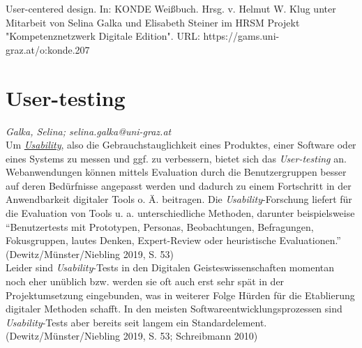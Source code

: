 \documentclass{article}
\begin{document}
User-centered design. In: KONDE Weißbuch. Hrsg. v. Helmut W. Klug unter Mitarbeit von Selina Galka und Elisabeth Steiner im HRSM Projekt "Kompetenznetzwerk Digitale Edition". URL: https://gams.uni-graz.at/o:konde.207\newpage\section*{User-testing} \emph{Galka, Selina; selina.galka@uni-graz.at}\\
        
    Um \emph{\href{http://gams.uni-graz.at/o:konde.205}{Usability}}, also die Gebrauchstauglichkeit eines Produktes, einer Software oder eines
                  Systems zu messen und ggf. zu verbessern, bietet sich das \emph{User-testing} an. Webanwendungen können mittels Evaluation durch die
                  Benutzergruppen besser auf deren Bedürfnisse angepasst werden und dadurch zu einem
                  Fortschritt in der Anwendbarkeit digitaler Tools o. Ä. beitragen. Die \emph{Usability}-Forschung liefert für die Evaluation von Tools u.
                  a. unterschiedliche Methoden, darunter beispielsweise “Benutzertests mit
                  Prototypen, Personas, Beobachtungen, Befragungen, Fokusgruppen, lautes Denken,
                  Expert-Review oder heuristische Evaluationen.” (Dewitz/Münster/Niebling
                     2019, S. 53)\\
            
        Leider sind \emph{Usability}-Tests in den Digitalen
                  Geisteswissenschaften momentan noch eher unüblich bzw. werden sie oft auch erst
                  sehr spät in der Projektumsetzung eingebunden, was in weiterer Folge Hürden für
                  die Etablierung digitaler Methoden schafft. In den meisten
                  Softwareentwicklungsprozessen sind \emph{Usability}-Tests aber
                  bereits seit langem ein Standardelement. (Dewitz/Münster/Niebling 2019, S.
                     53; Schreibmann 2010)\\
            
\end{document}
